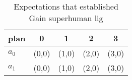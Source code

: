 \documentclass[a4paper]{article}
\begin{document}
\begin{table}
\begin{adjustbox}{width=0.8\columnwidth}
\begin{tabular}{|l|l|l|l|l|}
\hline
\textbf{plan} & \multicolumn{1}{c|}{\textbf{0}} & \multicolumn{1}{c|}{\textbf{1}} & \multicolumn{1}{c|}{\textbf{2}} & \multicolumn{1}{c|}{\textbf{3}} \\ \hline
\textbf{$a_0$}  & (0,0) & (1,0) & (2,0) & (3,0) \\ \hline
\textbf{$a_1$}  & (0,0) & (1,0) & (2,0) & (3,0) \\ \hline
\end{tabular}
\end{adjustbox}
\caption{Expectations that established Gain superhuman lig
}
\end{table}
\end{document}
